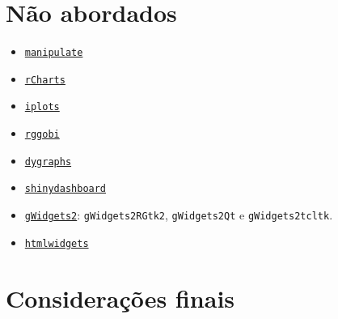 \section{Não abordados}

\begin{frame}

  \begin{itemize}
  \item 
    \href{https://cran.r-project.org/web/packages/manipulate/index.html}{\texttt{manipulate}}
  \item 
    \href{http://ramnathv.github.io/rCharts/}{\texttt{rCharts}}
  \item
    \href{http://cran.r-project.org/web/packages/iplots/index.html}{\texttt{iplots}}
  \item
    \href{http://cran.r-project.org/web/packages/rggobi/index.html}{\texttt{rggobi}}
  \item
    \href{https://rstudio.github.io/dygraphs/index.html}{\texttt{dygraphs}}
  \item
    \href{http://rstudio.github.io/shinydashboard/index.html}{\texttt{shinydashboard}}
  \item
    \href{https://cran.r-project.org/web/packages/gWidgets2/index.html}{\texttt{gWidgets2}}:
    \texttt{gWidgets2RGtk2}, \texttt{gWidgets2Qt} e \texttt{gWidgets2tcltk}.
  \item
    \href{http://www.htmlwidgets.org/index.html}{\texttt{htmlwidgets}}
  \end{itemize}

\end{frame}

\section{Considerações finais}


